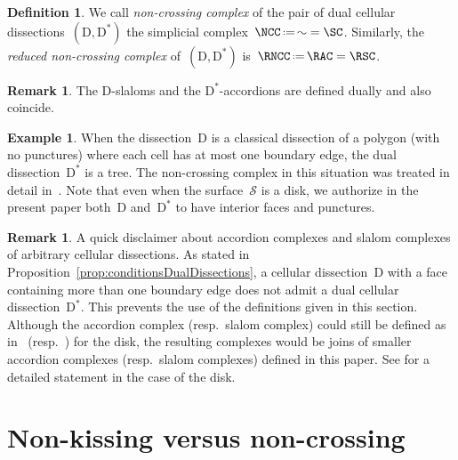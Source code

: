 \documentclass{amsart}
\theoremstyle{definition}
\newtheorem{definition}[theorem]{Definition}
\newtheorem{example}[theorem]{Example}
\newtheorem{remark}[theorem]{Remark}
\newcommand{\eqdef}{\mbox{\,\raisebox{0.2ex}{\scriptsize\ensuremath{\mathrm:}}\ensuremath{=}\,}} %
\newcommand{\darkblue}{\color{darkblue}} %
\newcommand{\defn}[1]{\textsl{\darkblue #1}} %
\newcommand{\surface}{\mathcal{S}} %
\newcommand{\dual}{^*} %
\newcommand{\dissection}{\mathrm{D}} %
\begin{document}
\begin{definition}
\label{def:noncrossingComplex}
We call \defn{non-crossing complex} of the pair of dual cellular dissections~$(\dissection, \dissection\dual)$ the simplicial complex~$\NCC \eqdef \AC = \SC$.
Similarly, the \defn{reduced non-crossing complex} of~$(\dissection, \dissection\dual)$ is~$\RNCC \eqdef \RAC = \RSC$.
\end{definition}

\begin{remark}
The $\dissection$-slaloms and the $\dissection\dual$-accordions are defined dually and also coincide.
\end{remark}

\begin{example}
When the dissection~$\dissection$ is a classical dissection of a polygon (with no punctures) where each cell has at most one boundary edge, the dual dissection~$\dissection\dual$ is a tree.
The non-crossing complex in this situation was treated in detail in~\cite{GarverMcConville, MannevillePilaud-accordion}.
Note that even when the surface~$\surface$ is a disk, we authorize in the present paper both~$\dissection$ and~$\dissection\dual$ to have interior faces and punctures.
\end{example}

\begin{remark}
A quick disclaimer about accordion complexes and slalom complexes of arbitrary cellular dissections.
As stated in Proposition~\ref{prop:conditionsDualDissections}, a cellular dissection~$\dissection$ with a face containing more than one boundary edge does not admit a dual cellular dissection~$\dissection\dual$.
This prevents the use of the definitions given in this section.
Although the accordion complex (resp.~slalom complex) could still be defined as in~\cite{MannevillePilaud-accordion} (resp.~\cite{GarverMcConville}) for the disk, the resulting complexes would be joins of smaller accordion complexes (resp.~slalom complexes) defined in this paper.
See \cite[Prop.~2.4]{MannevillePilaud-accordion} for a detailed statement in the case of the disk.
\end{remark}

\section{Non-kissing versus non-crossing}
\end{document}
